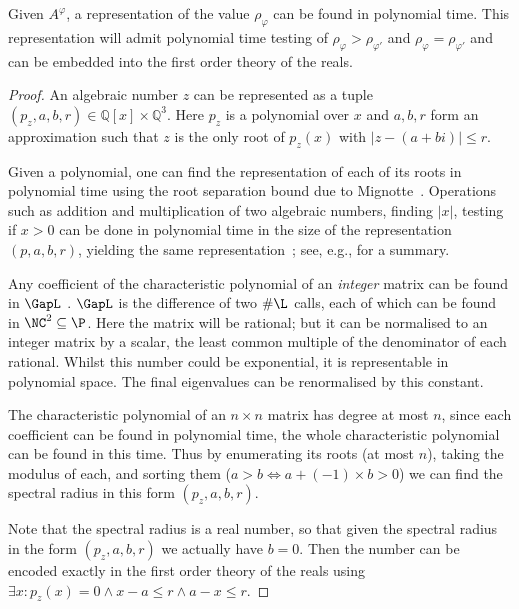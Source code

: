 \documentclass{lmcs}
\theoremstyle{plain}
\theoremstyle{definition}
\theoremstyle{remark}
\newcommand{\scc}{\varphi}
\begin{document}
\begin{lem}\label{lem:algebraic}
Given $A^\scc$, a representation of the value $\rho_\scc$ can be found in polynomial time. This representation will admit polynomial time testing of $\rho_\scc > \rho_{\scc'}$ and $\rho_\scc = \rho_{\scc'}$ and can be embedded into the first order theory of the reals.
\end{lem}

\begin{proof}
An algebraic number $z$ can be represented as a tuple $(p_z, a,b,r) \in \mathbb{Q}[x] \times \mathbb{Q}^3$. Here $p_z$ is a polynomial over $x$ and $a,b,r$ form an approximation such that $z$ is the only root of $p_z(x)$ with $|z- (a+bi)| \le r$.

Given a polynomial, one can find the representation of each of its roots in polynomial time using the root separation bound due to Mignotte~\cite{Mig82}. Operations such as addition and multiplication of two algebraic numbers, finding $|x|$, testing if $x > 0$ can be done in polynomial time in the size of the representation $(p,a,b,r)$, yielding the same representation~\cite{basu2005betti,cohen2013course,pan1996optimal}; see, e.g., \cite[Section~3]{ouaknine2014positivity} for a summary.

Any coefficient of the characteristic polynomial of an \textit{integer} matrix can be found in $\GapL$ \cite{hoang2003complexity}. $\GapL$ is the difference of two $\#\L$ calls, each of which can be found in $\NC^2 \subseteq \P$. Here the matrix will be rational; but it can be normalised to an integer matrix by a scalar, the least common multiple of the denominator of each rational. Whilst this number could be exponential, it is representable in polynomial space. The final eigenvalues can be  renormalised by this constant.

The characteristic polynomial of an $n\times n$ matrix has degree at most $n$, since each coefficient can be found in polynomial time, the whole characteristic polynomial can be found in this time. Thus by enumerating its roots (at most $n$), taking the modulus of each, and sorting them ($a > b \iff a + (-1) \times b >0$) we can find the spectral radius in this form $(p_z, a,b,r)$.

Note that the spectral radius is a real number, so that given the spectral radius in the form $(p_z, a,b,r)$ we actually have $b = 0$. Then the number can be encoded exactly in the first order theory of the reals using $\exists x : p_z(x) = 0 \wedge x - a \le r \wedge a - x \le r$.
\end{proof}
\end{document}

